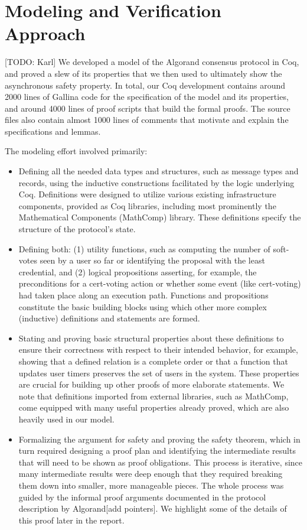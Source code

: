 \section{Modeling and Verification Approach}
\label{sec:approach}

[TODO: Karl]
We developed a model of the Algorand consensus protocol in Coq, and proved a slew of its properties that we then used to ultimately show the asynchronous safety property. In total, our Coq development contains around 2000 lines of Gallina code for the specification of the model and its properties, and around 4000 lines of proof scripts that build the formal proofs. The source files also contain almost 1000 lines of comments that motivate and explain the specifications and lemmas.

The modeling effort involved primarily:
\begin{itemize}
\item Defining all the needed data types and structures, such as message types and records, using the inductive constructions facilitated by the logic underlying Coq. Definitions were designed to utilize various existing infrastructure components, provided as Coq libraries, including most prominently the Mathematical Components (MathComp) library. These definitions specify the structure of the protocol’s state.
\item Defining both: (1) utility functions, such as computing the number of soft-votes seen by a user so far or identifying the proposal with the least credential, and (2) logical propositions asserting, for example, the preconditions for a cert-voting action or whether some event (like cert-voting) had taken place along an execution path. Functions and propositions constitute the basic building blocks using which other more complex (inductive) definitions and statements are formed.
\item Stating and proving basic structural properties about these definitions to ensure their correctness with respect to their intended behavior, for example, showing that a defined relation is a complete order or that a function that updates user timers preserves the set of users in the system. These properties are crucial for building up other proofs of more elaborate statements. We note that definitions imported from external libraries, such as MathComp, come equipped with many useful properties already proved, which are also heavily used in our model.
\item Formalizing the argument for safety and proving the safety theorem, which in turn required designing a proof plan and identifying the intermediate results that will need to be shown as proof obligations. This process is iterative, since many intermediate results were deep enough that they required breaking them down into smaller, more manageable pieces. The whole process was guided by the informal proof arguments documented in the protocol description by Algorand[add pointers]. We highlight some of the details of this proof later in the report.
\end{itemize}

